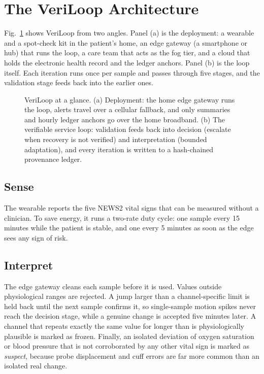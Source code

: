 \documentclass[journal]{IEEEtran}
\begin{document}
\section*{The VeriLoop Architecture}

Fig.~\ref{fig:arch} shows VeriLoop from two angles. Panel (a) is the deployment: a wearable and a spot-check kit in
the patient's home, an edge gateway (a smartphone or hub) that runs the loop, a care team that acts as the fog tier,
and a cloud that holds the electronic health record and the ledger anchors. Panel (b) is the loop itself. Each
iteration runs once per sample and passes through five stages, and the validation stage feeds back into the earlier
ones.

\begin{figure}[t]
\centering
\resizebox{\textwidth}{!}{}
\caption{VeriLoop at a glance. (a) Deployment: the home edge gateway runs the loop, alerts travel over a cellular
fallback, and only summaries and hourly ledger anchors go over the home broadband. (b) The verifiable service loop:
validation feeds back into decision (escalate when recovery is not verified) and interpretation (bounded adaptation),
and every iteration is written to a hash-chained provenance ledger.}
\label{fig:arch}
\end{figure}

\subsection*{Sense}

The wearable reports the five NEWS2 vital signs that can be measured without a clinician. To save energy, it runs a
two-rate duty cycle: one sample every 15 minutes while the patient is stable, and one every 5 minutes as soon as the
edge sees any sign of risk.

\subsection*{Interpret}

The edge gateway cleans each sample before it is used. Values outside physiological ranges are rejected. A jump larger
than a channel-specific limit is held back until the next sample confirms it, so single-sample motion spikes never reach
the decision stage, while a genuine change is accepted five minutes later. A channel that repeats exactly the same value
for longer than is physiologically plausible is marked as frozen. Finally, an isolated deviation of oxygen saturation or
blood pressure that is not corroborated by any other vital sign is marked as \emph{suspect}, because probe displacement
and cuff errors are far more common than an isolated real change.
\end{document}
